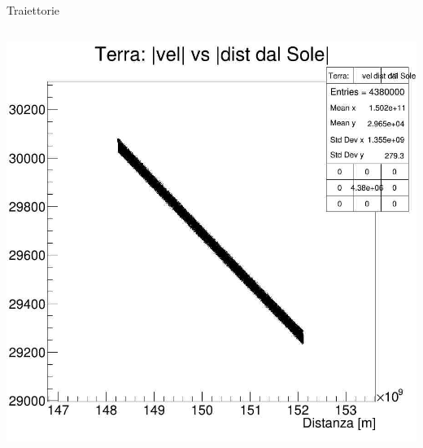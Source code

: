 \begin{frame}{Traiettorie}
\begin{columns}
                    \includegraphics[width=.9\textwidth]{5_distanza/terra_vdds_luna.jpg}
            \end{columns}
        \end{frame}
        
